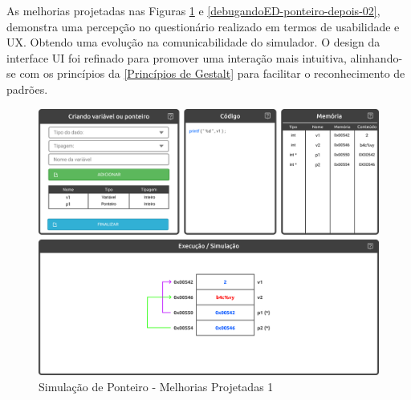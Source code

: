 As melhorias projetadas nas Figuras \ref{debugandoED-ponteiro-depois-01} e \ref{debugandoED-ponteiro-depois-02}, demonstra uma percepção no questionário realizado em termos de usabilidade e \ac{UX}. Obtendo uma evolução na comunicabilidade do simulador. O design da interface \ac{UI} foi refinado para promover uma interação mais intuitiva, alinhando-se com os princípios da \autoref{Princípios de Gestalt} para facilitar o reconhecimento de padrões.

\begin{figure}[htb]
    \begin{center}
        \includegraphics[scale=0.25]{figs/debugandoED-ponteiro-depois-01.png}
    \end{center}
    \caption{\label{debugandoED-ponteiro-depois-01}Simulação de Ponteiro - Melhorias Projetadas 1}
\end{figure}

